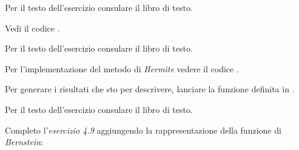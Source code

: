 \begin{exercise}[4.8]
Per il testo dell'esercizio consulare il libro di testo.
\end{exercise}
Vedi il codice . 

\begin{exercise}[4.9]
Per il testo dell'esercizio consulare il libro di testo.
\end{exercise}
Per l'implementazione del metodo di \emph{Hermite} vedere il codice
.

Per generare i risultati
che sto per descrivere, lanciare la funzione definita in
. 
\begin{center} 

\end{center}
\begin{center} 

\end{center}

\begin{exercise}[4.11]
Per il testo dell'esercizio consulare il libro di testo.
\end{exercise}
Completo l'\emph{esercizio 4.9} aggiungendo la rappresentazione della funzione
di \emph{Bernstein}: 
\begin{center}  

\end{center}







